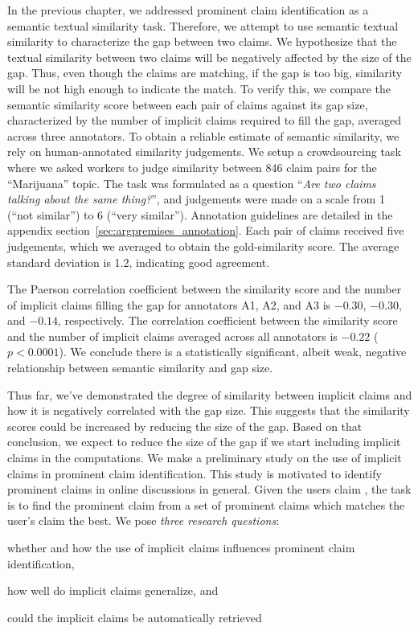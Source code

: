 In the previous chapter, we addressed prominent claim identification as a semantic
textual similarity task. 
Therefore, we attempt to use semantic textual similarity to characterize the gap
between two claims. 
We hypothesize that the textual similarity between two claims will be
negatively affected by the size of the gap. 
Thus, even though the claims are matching, if the gap is too big, similarity will be not 
high enough to indicate the match. 
To verify this, we compare the semantic similarity score between each pair of 
claims against its gap size, characterized by the number of implicit claims
required to fill the gap, 
averaged across three annotators. 
To obtain a reliable estimate of semantic similarity, we rely on human-annotated 
similarity judgements. 
We setup a crowdsourcing task where we asked workers to judge similarity
between 846 claim pairs for the ``Marijuana'' topic. 
The task was formulated as a question ``\emph{Are two claims
talking about the same thing?}'', and judgements were made on a scale
from 1 (``not similar'') to 6 (``very similar''). 
Annotation guidelines are detailed in the appendix
section~\ref{sec:argpremises_annotation}. 
Each pair of claims received five judgements, which we averaged to obtain the
gold-similarity score. 
The average standard deviation is 1.2, indicating good agreement. 

The Paerson correlation coefficient  between the similarity score and the
number of implicit claims filling the gap for annotators A1, A2, and A3 is
$-0.30$, $-0.30$, and $-0.14$, respectively.  The correlation coefficient between the
similarity score and the number of implicit claims averaged across all annotators is
$-0.22$ ($p < 0.0001$).  We conclude there is a statistically significant,
albeit weak, negative relationship between semantic similarity and gap size. 

Thus far, we've demonstrated the degree of similarity between implicit 
claims and how it is negatively correlated with the gap size. 
This suggests that the similarity scores could be increased by reducing the size 
of the gap.
Based on that conclusion, we expect to reduce the size of the gap if we start
including implicit claims in the computations. 
We make a preliminary study on the use of implicit claims in prominent claim
identification.
This study is motivated to identify prominent claims in online discussions in
general.
Given the users claim , the task is to find the prominent claim from a set of 
prominent claims which matches the user's claim the best. 
We pose \emph{three research questions}: 
\begin{enumerate*}[label=(\arabic*)]
\item whether and how the use of implicit claims influences prominent claim identification, 
\item how well do implicit claims generalize, and 
\item could the implicit claims be automatically retrieved 
\end{enumerate*}

